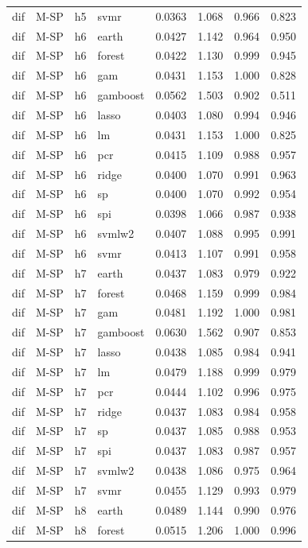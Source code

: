 \begin{ThreePartTable}
\begin{longtable}[t]{llclcccc}
dif & M-SP & h5 & svmr & 0.0363 & 1.068 & 0.966 & 0.823\\
\addlinespace
dif & M-SP & h6 & earth & 0.0427 & 1.142 & 0.964 & 0.950\\
dif & M-SP & h6 & forest & 0.0422 & 1.130 & 0.999 & 0.945\\
dif & M-SP & h6 & gam & 0.0431 & 1.153 & 1.000 & 0.828\\
dif & M-SP & h6 & gamboost & 0.0562 & 1.503 & 0.902 & 0.511\\
dif & M-SP & h6 & lasso & 0.0403 & 1.080 & 0.994 & 0.946\\
dif & M-SP & h6 & lm & 0.0431 & 1.153 & 1.000 & 0.825\\
dif & M-SP & h6 & pcr & 0.0415 & 1.109 & 0.988 & 0.957\\
dif & M-SP & h6 & ridge & 0.0400 & 1.070 & 0.991 & 0.963\\
dif & M-SP & h6 & sp & 0.0400 & 1.070 & 0.992 & 0.954\\
dif & M-SP & h6 & spi & 0.0398 & 1.066 & 0.987 & 0.938\\
dif & M-SP & h6 & svmlw2 & 0.0407 & 1.088 & 0.995 & 0.991\\
dif & M-SP & h6 & svmr & 0.0413 & 1.107 & 0.991 & 0.958\\
\addlinespace
dif & M-SP & h7 & earth & 0.0437 & 1.083 & 0.979 & 0.922\\
dif & M-SP & h7 & forest & 0.0468 & 1.159 & 0.999 & 0.984\\
dif & M-SP & h7 & gam & 0.0481 & 1.192 & 1.000 & 0.981\\
dif & M-SP & h7 & gamboost & 0.0630 & 1.562 & 0.907 & 0.853\\
dif & M-SP & h7 & lasso & 0.0438 & 1.085 & 0.984 & 0.941\\
dif & M-SP & h7 & lm & 0.0479 & 1.188 & 0.999 & 0.979\\
dif & M-SP & h7 & pcr & 0.0444 & 1.102 & 0.996 & 0.975\\
dif & M-SP & h7 & ridge & 0.0437 & 1.083 & 0.984 & 0.958\\
dif & M-SP & h7 & sp & 0.0437 & 1.085 & 0.988 & 0.953\\
dif & M-SP & h7 & spi & 0.0437 & 1.083 & 0.987 & 0.957\\
dif & M-SP & h7 & svmlw2 & 0.0438 & 1.086 & 0.975 & 0.964\\
dif & M-SP & h7 & svmr & 0.0455 & 1.129 & 0.993 & 0.979\\
\addlinespace
dif & M-SP & h8 & earth & 0.0489 & 1.144 & 0.990 & 0.976\\
dif & M-SP & h8 & forest & 0.0515 & 1.206 & 1.000 & 0.996\\

\end{longtable}
\end{ThreePartTable}
